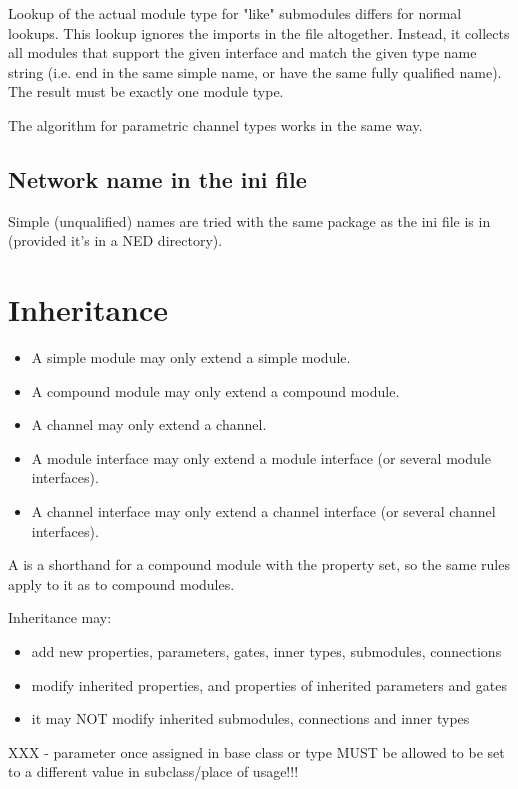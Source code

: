 Lookup of the actual module type for "like" submodules differs for normal
lookups. This lookup ignores the imports in the file altogether.
Instead, it collects all modules that support the given interface
and match the given type name string (i.e. end in the same simple name,
or have the same fully qualified name). The result must be exactly
one module type.

The algorithm for parametric channel types works in the same way.


\subsection{Network name in the ini file}

Simple (unqualified) names are tried with the same package as the
ini file is in (provided it's in a NED directory).


\section{Inheritance}

\begin{itemize}
  \item A simple module may only extend a simple module.
  \item A compound module may only extend a compound module.
  \item A channel may only extend a channel.
  \item A module interface may only extend a module interface (or several module
        interfaces).
  \item A channel interface may only extend a channel interface (or several
        channel interfaces).
\end{itemize}

A  is a shorthand for a compound module with the 
property set, so the same rules apply to it as to compound modules.

Inheritance may:
\begin{itemize}
  \item add new properties, parameters, gates, inner types, submodules,
        connections
  \item modify inherited properties, and properties of inherited parameters and
        gates
  \item it may NOT modify inherited submodules, connections and inner types
\end{itemize}

XXX
- parameter once assigned in base class or type MUST be allowed to be
  set to a different value in subclass/place of usage!!!

